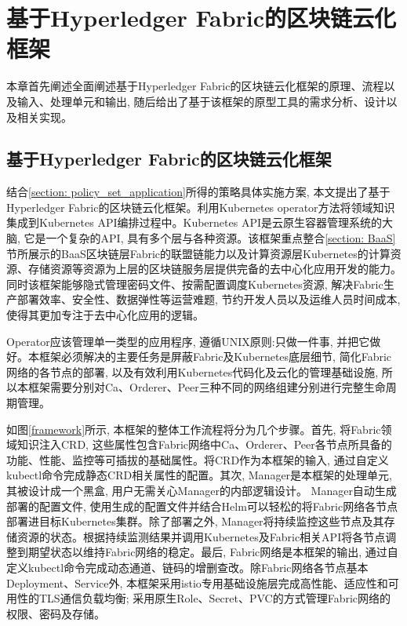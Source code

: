\chapter{基于Hyperledger Fabric的区块链云化框架}

本章首先阐述全面阐述基于Hyperledger Fabric的区块链云化框架的原理、流程以及输入、处理单元和输出, 随后给出了基于该框架的原型工具的需求分析、设计以及相关实现。

\section{基于Hyperledger Fabric的区块链云化框架}\label{section: framework}

结合\ref{section: policy_set_application}所得的策略具体实施方案, 本文提出了基于Hyperledger Fabric的区块链云化框架。利用Kubernetes operator方法将领域知识集成到Kubernetes API编排过程中\cite{henning2021reproducible}。Kubernetes API是云原生容器管理系统的大脑, 它是一个复杂的API, 具有多个层与各种资源\cite{Yilmaz2021}。该框架重点整合\ref{section: BaaS}节所展示的BaaS区块链层Fabric的联盟链能力以及计算资源层Kubernetes的计算资源、存储资源等资源为上层的区块链服务层提供完备的去中心化应用开发的能力。同时该框架能够隐式管理密码文件、按需配置调度Kubernetes资源, 解决Fabric生产部署效率、安全性、数据弹性等运营难题, 节约开发人员以及运维人员时间成本, 使得其更加专注于去中心化应用的逻辑。

Operator应该管理单一类型的应用程序, 遵循UNIX原则:只做一件事, 并把它做好\cite{d2020design}。本框架必须解决的主要任务是屏蔽Fabric及Kubernetes底层细节, 简化Fabric网络的各节点的部署, 以及有效利用Kubernetes代码化及云化的管理基础设施, 所以本框架需要分别对Ca、Orderer、Peer三种不同的网络组建分别进行完整生命周期管理。

如图\ref{framework}所示, 本框架的整体工作流程将分为几个步骤。首先, 将Fabric领域知识注入CRD, 这些属性包含Fabric网络中Ca、Orderer、Peer各节点所具备的功能、性能、监控等可插拔的基础属性。将CRD作为本框架的输入, 通过自定义kubectl命令完成静态CRD相关属性的配置。其次, Manager是本框架的处理单元, 其被设计成一个黑盒\cite{yu2020system}, 用户无需关心Manager的内部逻辑设计。 Manager自动生成部署的配置文件, 使用生成的配置文件并结合Helm可以轻松的将Fabric网络各节点部署进目标Kubernetes集群。除了部署之外, Manager将持续监控这些节点及其存储资源的状态。根据持续监测结果并调用Kubernetes及Fabric相关API将各节点调整到期望状态以维持Fabric网络的稳定。最后, Fabric网络是本框架的输出, 通过自定义kubectl命令完成动态通道、链码的增删查改。除Fabric网络各节点基本Deployment、Service外, 本框架采用istio专用基础设施层完成高性能、适应性和可用性\cite{li2019service}\cite{larsson2020impact}的TLS通信负载均衡; 采用原生Role、Secret、PVC的方式管理Fabric网络的权限、密码及存储。

